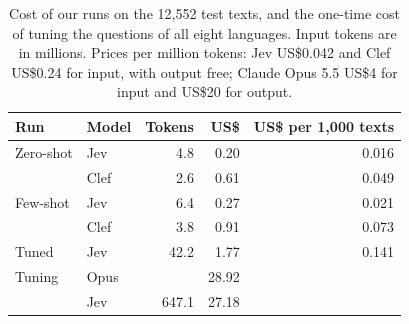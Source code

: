 \begin{table}[t]
\centering
\caption{Cost of our runs on the 12,552 test texts, and the one-time cost of tuning the questions of all eight languages. Input tokens are in millions. Prices per million tokens: Jev US\$0.042 and Clef US\$0.24 for input, with output free; Claude Opus 5.5 US\$4 for input and US\$20 for output.}
\label{tab:costs}
\setlength{\tabcolsep}{4pt}
\begin{tabular}{llrrr}
\toprule
Run & Model & Tokens & US\$ & US\$ per 1,000 texts \\
\midrule
Zero-shot & Jev & 4.8 & 0.20 & 0.016 \\
 & Clef & 2.6 & 0.61 & 0.049 \\
\addlinespace
Few-shot & Jev & 6.4 & 0.27 & 0.021 \\
 & Clef & 3.8 & 0.91 & 0.073 \\
\addlinespace
Tuned & Jev & 42.2 & 1.77 & 0.141 \\
\addlinespace
Tuning & Opus & & 28.92 & \\
 & Jev & 647.1 & 27.18 & \\
\bottomrule
\end{tabular}
\end{table}
